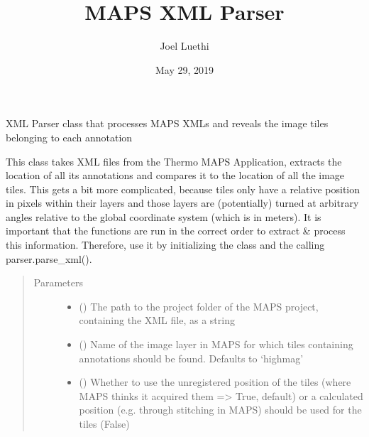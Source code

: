 \documentclass[letterpaper,10pt,english]{sphinxmanual}
\title{MAPS XML Parser}
\date{May 29, 2019}
\author{Joel Luethi}
\begin{document}
\pagestyle{empty}
\sphinxmaketitle
\pagestyle{plain}
\sphinxtableofcontents
\pagestyle{normal}
\label{\detokenize{index::doc}}


\begin{fulllineitems}
\label{\detokenize{index:sites_of_interest_parser.MapsXmlParser}}
XML Parser class that processes MAPS XMLs and reveals the image tiles belonging to each annotation

This class takes XML files from the Thermo MAPS Application, extracts the location of all its annotations and
compares it to the location of all the image tiles. This gets a bit more complicated, because tiles only have a
relative position in pixels within their layers and those layers are (potentially) turned at arbitrary angles
relative to the global coordinate system (which is in meters).
It is important that the functions are run in the correct order to extract \& process this information. Therefore,
use it by initializing the class and the calling parser.parse\_xml().
\begin{quote}\begin{description}
\item[{Parameters}] \leavevmode\begin{itemize}
\item {} 
 () \textendash{} The path to the project folder of the MAPS project, containing the XML file, as a string

\item {} 
 () \textendash{} Name of the image layer in MAPS for which tiles containing annotations should
be found. Defaults to ‘highmag’

\item {} 
 () \textendash{} Whether to use the unregistered position of the tiles (where MAPS thinks it
acquired them =\textgreater{} True, default) or a calculated position (e.g. through stitching in MAPS) should be used for
the tiles (False)


\end{itemize}
\end{description}
\end{quote}
\end{fulllineitems}
\end{document}

